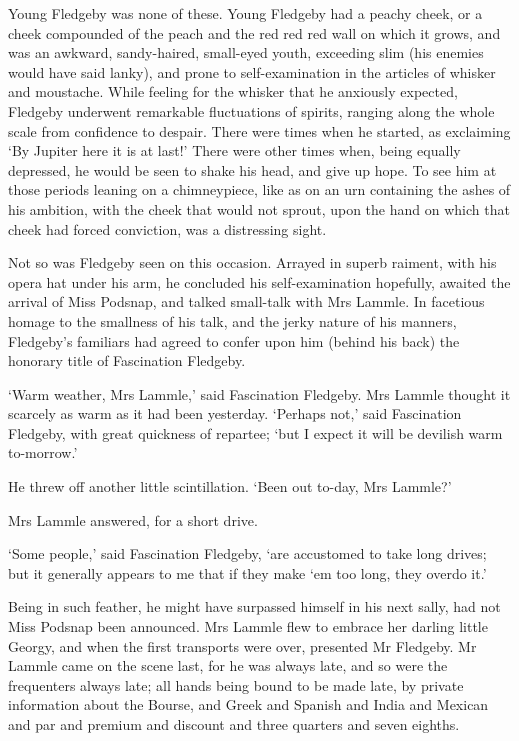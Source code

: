 Young Fledgeby was none of these. Young Fledgeby had a peachy cheek,
or a cheek compounded of the peach and the red red red wall on which
it grows, and was an awkward, sandy-haired, small-eyed youth, exceeding
slim (his enemies would have said lanky), and prone to self-examination
in the articles of whisker and moustache. While feeling for the whisker
that he anxiously expected, Fledgeby underwent remarkable fluctuations
of spirits, ranging along the whole scale from confidence to despair.
There were times when he started, as exclaiming ‘By Jupiter here it is
at last!’ There were other times when, being equally depressed, he would
be seen to shake his head, and give up hope. To see him at those periods
leaning on a chimneypiece, like as on an urn containing the ashes of his
ambition, with the cheek that would not sprout, upon the hand on which
that cheek had forced conviction, was a distressing sight.

Not so was Fledgeby seen on this occasion. Arrayed in superb raiment,
with his opera hat under his arm, he concluded his self-examination
hopefully, awaited the arrival of Miss Podsnap, and talked small-talk
with Mrs Lammle. In facetious homage to the smallness of his talk, and
the jerky nature of his manners, Fledgeby’s familiars had agreed to
confer upon him (behind his back) the honorary title of Fascination
Fledgeby.

‘Warm weather, Mrs Lammle,’ said Fascination Fledgeby. Mrs Lammle
thought it scarcely as warm as it had been yesterday. ‘Perhaps not,’
said Fascination Fledgeby, with great quickness of repartee; ‘but I
expect it will be devilish warm to-morrow.’

He threw off another little scintillation. ‘Been out to-day, Mrs
Lammle?’

Mrs Lammle answered, for a short drive.

‘Some people,’ said Fascination Fledgeby, ‘are accustomed to take long
drives; but it generally appears to me that if they make ‘em too long,
they overdo it.’

Being in such feather, he might have surpassed himself in his next
sally, had not Miss Podsnap been announced. Mrs Lammle flew to embrace
her darling little Georgy, and when the first transports were over,
presented Mr Fledgeby. Mr Lammle came on the scene last, for he was
always late, and so were the frequenters always late; all hands being
bound to be made late, by private information about the Bourse, and
Greek and Spanish and India and Mexican and par and premium and discount
and three quarters and seven eighths.

